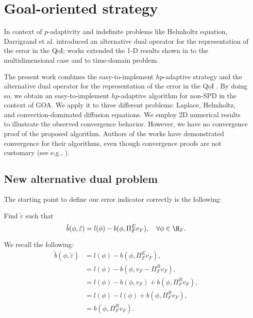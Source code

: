 \section{Goal-oriented strategy}
\label{sec:GO-str}

In context of $p$-adaptivity and indefinite problems like Helmholtz equation, Darrigrand et al. \cite{darrigrand2015goal}  introduced an alternative dual operator for the representation of the error in the \ac{QoI}; works \cite{darrigrand2018goal} extended the 1-D results shown in \cite{darrigrand2015goal} to the multidimensional case and \cite{munoz2017time} to time-domain problem.

The present work combines the easy-to-implement $hp$-adaptive strategy \cite{darrigrand2020painless} and the alternative dual operator for the representation of the error in the \ac{QoI} \cite{darrigrand2015goal}. By doing so, we obtain an easy-to-implement $hp$-adaptive algorithm for non-SPD in the context of \ac{GOA}. We apply it to three different problems: Laplace, Helmholtz, and convection-dominated diffusion equations. We employ $2$D numerical results to illustrate the observed convergence behavior. However, we have no convergence proof of the proposed algorithm. Authors of the works \cite{mommer2009goal, pollock2012convergence,feischl2016abstract,canuto2017convergence, burgdorfler2011, canuto2017aconvergence, binev2018tree, holstpollock2016} have demonstrated convergence for their algorithms, even though convergence proofs are not customary (see e.g., \cite{demkowicz2007computing, rachowicz2006fully}).

\subsection{New alternative dual problem}
The starting point to define our error indicator correctly is the following:
\begin{var_for}
  Find $\tilde{\varepsilon}$ such that
  \begin{equation}
    \label{eq:alternativeind}
    \tilde{b}(\phi, \tilde{\varepsilon})=l(\phi) - b(\phi, \Pi_{F}^{E} v_{F}), \quad \forall \phi\in \H_{F}.
  \end{equation}
\end{var_for}
We recall the following:
\begin{align}
  \tilde{b}(\phi, \tilde{\varepsilon}) & =l(\phi) - b(\phi, \Pi_{F}^{E} v_{F}),                   \\
                                       & = l(\phi) - b(\phi, v_{F} - \Pi_{F}^{R} v_{F}),          \\
                                       & = l(\phi) - b(\phi, v_{F}) + b(\phi, \Pi_{F}^{R} v_{F}), \\
                                       & = l(\phi) - l(\phi) + b(\phi, \Pi_{F}^{R} v_{F}),        \\
                                       & = b(\phi, \Pi_{F}^{R} v_{F}). \label{eq:altjust}
\end{align}

